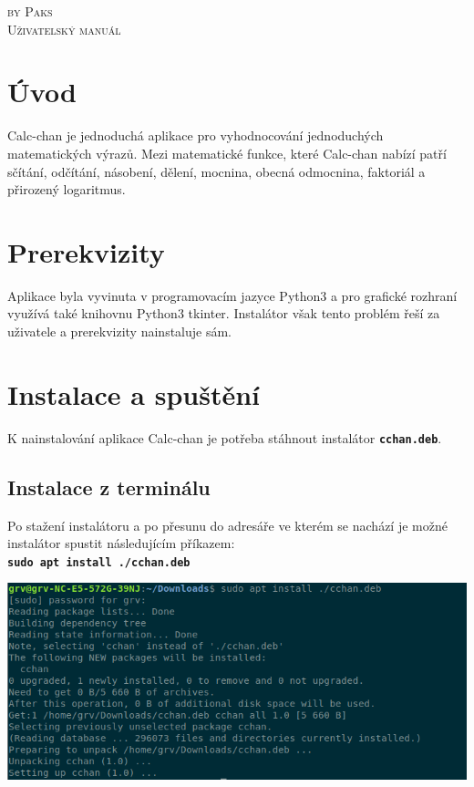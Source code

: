 \documentclass[a4paper, 11pt]{article}
\begin{document}
\begin{titlepage}
\vspace*{\fill}
 {\Large \textsc{by Paks}}\\[0.3em]
{\fontsize{40}{40}\textsc{Uživatelský manuál}}
\vspace*{\fill}
\end{titlepage}
	
\tableofcontents

\newpage

\section{Úvod}
Calc-chan je jednoduchá aplikace pro vyhodnocování jednoduchých matematických výrazů. Mezi matematické funkce, které Calc-chan nabízí patří sčítání, odčítání, násobení, dělení, mocnina, obecná odmocnina, faktoriál a přirozený logaritmus.

\section{Prerekvizity}
Aplikace byla vyvinuta v programovacím jazyce Python3 a pro grafické rozhraní využívá také knihovnu Python3 tkinter. Instalátor však tento problém řeší za uživatele a prerekvizity nainstaluje sám.

\section{Instalace a spuštění}
K nainstalování aplikace Calc-chan je potřeba stáhnout instalátor \texttt{\textbf{cchan.deb}}.
\subsection{Instalace z terminálu}
\noindent Po stažení instalátoru a po přesunu do adresáře ve kterém se nachází je možné instalátor spustit následujícím příkazem:\\
\texttt{\textbf{sudo apt install ./cchan.deb}}\\
\begin{center}
\includegraphics[scale=0.65]{installterminal.png}\\
\end{center}
\newpage
\end{document}
